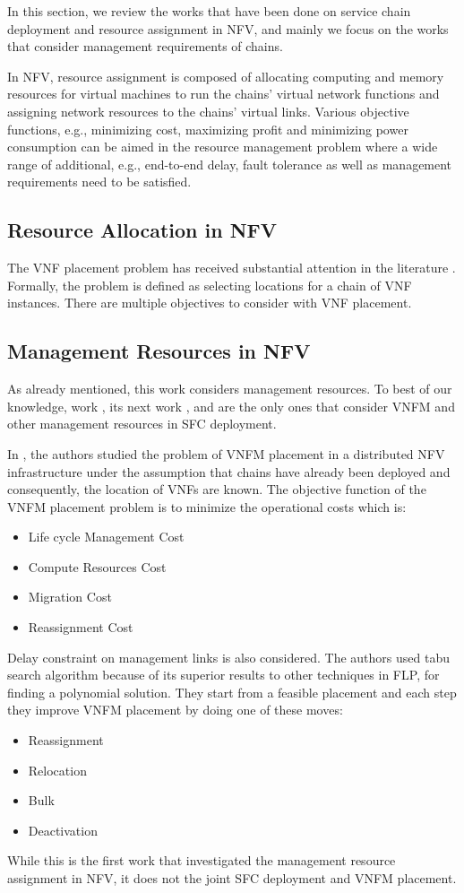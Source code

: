 In this section, we review the works that have been done on service chain deployment and resource assignment in NFV, and mainly we focus on the works that consider management requirements of chains.

In NFV, resource assignment is composed of
allocating computing and memory resources for virtual machines to run the chains' virtual network functions and assigning network resources to the chains' virtual links. Various objective functions, e.g., minimizing cost, maximizing profit and minimizing power consumption can be aimed in the resource management problem where a wide range of additional, e.g., end-to-end delay, fault tolerance as well as management requirements need to be satisfied.

\subsection{Resource Allocation in NFV}
The VNF placement problem has received substantial attention in the literature \cite{GilHerrera2016}.
Formally, the problem is defined as selecting locations for a chain of VNF instances.
There are multiple objectives to consider with VNF placement.

\subsection{Management Resources in NFV}
As already mentioned, this work considers management resources. To best of our knowledge, work \cite{AbuLebdeh2017}, its next work \cite{AbuLebdeh20172}, and \cite{Chiang2019} are the only ones that consider VNFM and other management resources in SFC deployment.

In \cite{AbuLebdeh2017}, the authors studied the problem of VNFM placement in a distributed NFV infrastructure under the assumption that chains have already been deployed and consequently, the location of VNFs are known.
The objective function of the VNFM placement problem is to minimize the operational costs which is:
\begin{itemize}
    \item Life cycle Management Cost
    \item Compute Resources Cost
    \item Migration Cost
    \item Reassignment Cost
\end{itemize}
Delay constraint on management links is also considered.
The authors used tabu search algorithm because of its superior results to other techniques in FLP, for finding a polynomial solution. They start from a feasible placement and each step they improve VNFM placement by doing one of these moves:
\begin{itemize}
    \item Reassignment
    \item Relocation
    \item Bulk
    \item Deactivation
\end{itemize}
While this is the first work that investigated the management resource assignment in NFV, it does not the joint SFC deployment and VNFM placement.


